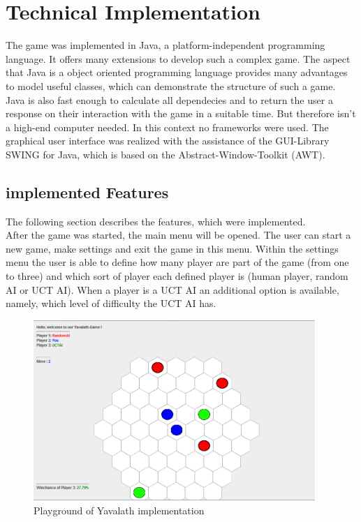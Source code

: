 \documentclass[german]{report}
\begin{document}
\chapter{Technical Implementation}
\label{sec:technImplementation}
The game was implemented in Java, a platform-independent programming language.
It offers many extensions to develop such a complex game. The aspect that Java
is a object oriented programming language provides many advantages to model
useful classes, which can demonstrate the structure of such a game. Java is also
fast enough to calculate all dependecies and to return the user a
response on their interaction with the game in a suitable time. But therefore
isn't a high-end computer needed. In this context no frameworks were used. The
graphical user interface was realized with the assistance of the GUI-Library
SWING for Java, which is based on the Abstract-Window-Toolkit (AWT).  
\section{implemented Features}
The following section describes the features, which were implemented. \\
After the game was started, the main menu will be opened. The user can start a new game, make settings and exit the game in this menu. Within the settings menu the user is able to define how many player are part of the game (from one to three) and which sort of player each defined player is (human player, random AI or UCT AI). When a player is a UCT AI an additional option is available, namely, which level of difficulty the UCT AI has.
\newpage

\begin{figure}[ht]
\centering
\includegraphics[width=0.95\textwidth]{Abbildungen/exampleOfPlayGround.png}
\caption[Playground of Yavalath implementation]{Playground of Yavalath implementation}
\label{fig:playgroundOfYav}
\end{figure} 
\end{document}
